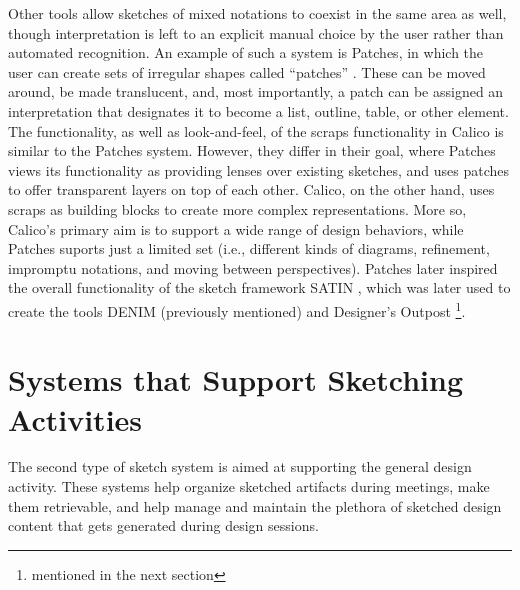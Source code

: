 Other tools allow sketches of mixed notations to coexist in the same area as well, though interpretation is left to an explicit manual choice by the user rather than automated recognition. An example of such a system is Patches, in which the user can create sets of irregular shapes called ``patches'' \citep{Kramer}. These can be moved around, be made translucent, and, most importantly, a patch can be assigned an interpretation that designates it to become a list, outline, table, or other element. The functionality, as well as look-and-feel, of the scraps functionality in Calico is similar to the Patches system. However, they differ in their goal, where Patches views its functionality as providing lenses over existing sketches, and uses patches to offer transparent layers on top of each other. Calico, on the other hand, uses scraps as building blocks to create more complex representations. More so, Calico's primary aim is to support a wide range of design behaviors, while Patches suports just a limited set (i.e., different kinds of diagrams, refinement, impromptu notations, and moving between perspectives). Patches later inspired the overall functionality of the sketch framework SATIN \citep{Hong}, which was later used to create the tools DENIM (previously mentioned) and Designer's Outpost \footnote{ mentioned in the next section}. 

\section{Systems that Support Sketching Activities}
\label{relatedwork:2}

The second type of sketch system is aimed at supporting the general design activity. These systems help organize sketched artifacts during meetings, make them retrievable, and help manage and maintain the plethora of sketched design content that gets generated during design sessions. 

